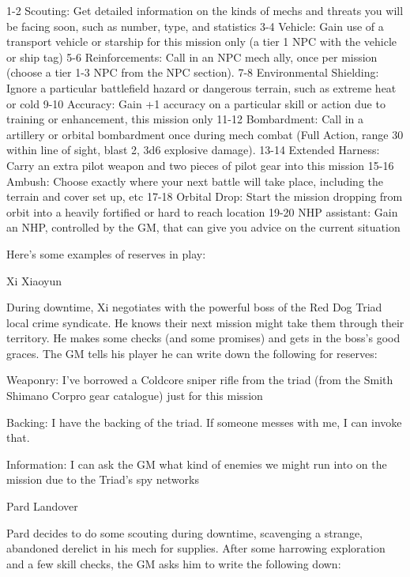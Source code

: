  1-2       Scouting: Get detailed information on the kinds of mechs and threats you will be  
           facing soon, such as number, type, and statistics 
 3-4       Vehicle: Gain use of a transport vehicle or starship for this mission only (a tier 1 NPC  
           with the vehicle or ship tag) 
 5-6       Reinforcements: Call in an NPC mech ally, once per mission (choose a tier 1-3 NPC  
           from the NPC section). 
 7-8       Environmental Shielding: Ignore a particular battlefield hazard or dangerous terrain,  
           such as extreme heat or cold 
 9-10      Accuracy: Gain +1 accuracy on a particular skill or action due to training or  
           enhancement, this mission only 
 11-12     Bombardment: Call in a artillery or orbital bombardment once during mech combat  
           (Full Action, range 30 within line of sight, blast 2, 3d6 explosive damage). 
 13-14     Extended Harness: Carry an extra pilot weapon and two pieces of pilot gear into this  
           mission 
 15-16     Ambush: Choose exactly where your next battle will take place, including the terrain  
           and cover set up, etc 
 17-18     Orbital Drop: Start the mission dropping from orbit into a heavily fortified or hard to  
           reach location 
 19-20     NHP assistant: Gain an NHP, controlled by the GM, that can give you advice on the  
           current situation 

Here’s some examples of reserves in play:
 

Xi Xiaoyun  

During downtime, Xi negotiates with the powerful boss of the Red Dog Triad local crime  
syndicate. He knows their next mission might take them through their territory. He makes some  
checks (and some promises) and gets in the boss’s good graces. The GM tells his player he can  
write down the following for reserves:
 
	        Weaponry: I’ve borrowed a Coldcore sniper rifle from the triad (from the Smith Shimano  
Corpro gear catalogue) just for this mission
 
	        Backing: I have the backing of the triad. If someone messes with me, I can invoke that.
 
	        Information: I can ask the GM what kind of enemies we might run into on the mission  
due to the Triad’s spy networks
 

Pard Landover  

Pard decides to do some scouting during downtime, scavenging a strange, abandoned derelict  
in his mech for supplies. After some harrowing exploration and a few skill checks, the GM asks  
him to write the following down:
 
